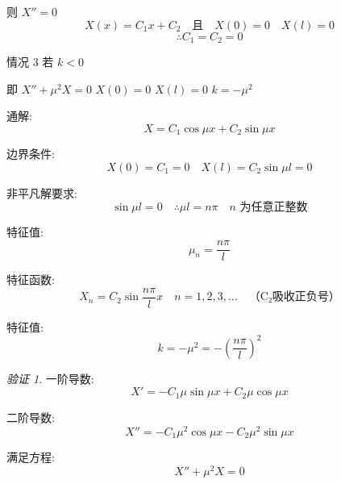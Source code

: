 \documentclass[12pt,a4paper]{article}
\numberwithin{subsection}{section}   %
\numberwithin{subsubsection}{subsection}
\theoremstyle{plain}
\theoremstyle{definition}
\theoremstyle{remark}
\theoremstyle{remark}
\newtheorem{verification}[theorem]{验证}
\begin{document}
则 \(X'' = 0\)
	\begin{equation}
		X(x) = C_1 x + C_2 \quad \text{且} \quad X(0) = 0 \quad X(l) = 0
	\end{equation}
	\begin{equation}
		\therefore C_1 = C_2 = 0
	\end{equation}
	
情况 3 \quad 若 \(k < 0\)

即 \(X'' + \mu^2 X = 0\) \quad \(X(0) = 0\) \quad \(X(l) = 0\) \quad \(k = -\mu^2\)
	
	通解:
	\begin{equation}
		X = C_1 \cos \mu x + C_2 \sin \mu x
	\end{equation}
	
	
	
	边界条件:
	\begin{equation}
		X(0) = C_1 = 0 \quad X(l) = C_2 \sin \mu l = 0
	\end{equation}
	
	非平凡解要求:
	\begin{equation}
		\sin \mu l = 0 \quad \therefore \mu l = n\pi \quad n \text{ 为任意正整数}
	\end{equation}
	
	特征值:
	\begin{equation}
		\mu_n = \frac{n\pi}{l}
	\end{equation}
	
	特征函数:
	\begin{equation}
		X_n = C_2 \sin \frac{n\pi}{l} x \quad n = 1, 2, 3, \ldots \quad \text{（C₂吸收正负号）}
	\end{equation}
	
	特征值:
	\begin{equation}
		k = -\mu^2 = -\left(\frac{n\pi}{l}\right)^2
	\end{equation}
	
	\begin{verification}	
		一阶导数:
		\begin{equation}
			X' = -C_1 \mu \sin \mu x + C_2 \mu \cos \mu x
		\end{equation}
		
		二阶导数:
		\begin{equation}
			X'' = -C_1 \mu^2 \cos \mu x - C_2 \mu^2 \sin \mu x
		\end{equation}
		
		满足方程:
		\begin{equation}
			X'' + \mu^2 X = 0
		\end{equation}
	\end{verification}	
	
\end{document}
